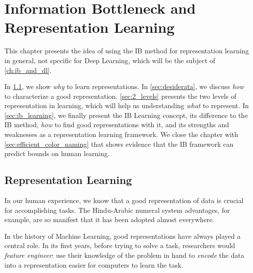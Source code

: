 \chapter{Information Bottleneck and Representation Learning}\label{ch:ib_and_rl}


This chapter presents the idea of using the \acf{IB} method for representation learning in general, not specific for Deep Learning, which will be the subject of \cref{ch:ib_and_dl}.

In \cref{sec:why_representation_learning}, we show \emph{why} to learn representations. In \cref{sec:desiderata}, we discuss \emph{how} to characterize a good representation. \cref{sec:2_levels} presents the two levels of representation in learning, which will help us understanding \emph{what} to represent. In \cref{sec:ib_learning}, we finally present the IB Learning concept, its difference to the IB method,  \emph{how} to find good representations with it, and its strengths and weaknesses as a representation learning framework. We close the chapter with \cref{sec:efficient_color_naming} that shows evidence that the IB framework can predict bounds on human learning.




\section{Representation Learning}\label{sec:why_representation_learning}
In our human experience, we know that a good representation of data is crucial for accomplishing tasks. The Hindu-Arabic numeral system advantages, for example, are so manifest that it has been adopted almost everywhere.

In the history of Machine Learning, good representations have always played a central role. In its first years, before trying to solve a task, researchers would \emph{feature engineer}: use their knowledge of the problem in hand to \emph{encode} the data into a representation easier for computers to learn the task.

